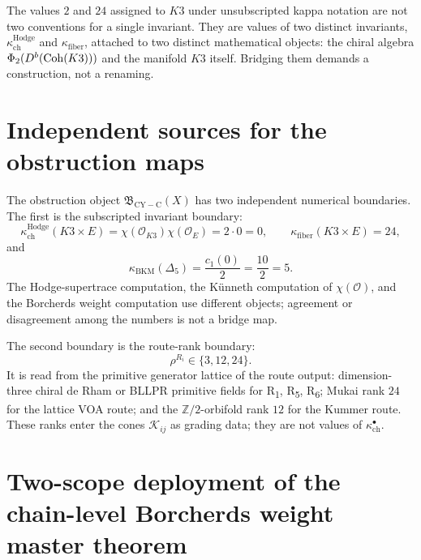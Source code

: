 \begin{remark}[\texorpdfstring{$\kappa_{\mathrm{ch}}^{\mathrm{Hodge}}(K3) = 2$}{kappa-ch(K3) = 2} vs.\ \texorpdfstring{$\kappa_{\mathrm{fiber}}(K3) = 24$}{kappa-fib(K3) = 24}: two invariants, one unsubscripted symbol]
\label{rem:kappa-K3-two-invariants}
The values $2$ and $24$ assigned to $K3$ under unsubscripted kappa
notation are not two conventions for a single invariant. They are values
of two distinct invariants, $\kappa_{\mathrm{ch}}^{\mathrm{Hodge}}$ and
$\kappa_{\mathrm{fiber}}$, attached to two distinct mathematical
objects: the chiral algebra $\Phi_2(D^b(\mathrm{Coh}(K3)))$ and the manifold
$K3$ itself. Bridging them demands a construction, not a renaming.
\end{remark}

\section{Independent sources for the obstruction maps}
\label{sec:cy-c-hziv}

The obstruction object
\(\mathfrak B_{\mathrm{CY-C}}(X)\) has two independent numerical
boundaries. The first is the subscripted invariant boundary:
\[
 \kappa_{\mathrm{ch}}^{\mathrm{Hodge}}(K3\times E)
 =\chi(\mathcal O_{K3})\chi(\mathcal O_E)=2\cdot 0=0,\qquad
 \kappa_{\mathrm{fiber}}(K3\times E)=24,
\]
and
\[
 \kappa_{\mathrm{BKM}}(\Delta_5)=\frac{c_1(0)}{2}=\frac{10}{2}=5.
\]
The Hodge-supertrace computation, the K\"unneth computation of
\(\chi(\mathcal O)\), and the Borcherds weight computation use
different objects; agreement or disagreement among the numbers is not a
bridge map.

The second boundary is the route-rank boundary:
\[
 \rho^{R_i}\in\{3,12,24\}.
\]
It is read from the primitive generator lattice of the route output:
dimension-three chiral de Rham or BLLPR primitive fields for
R\textsubscript{1}, R\textsubscript{5}, R\textsubscript{6}; Mukai
rank \(24\) for the lattice VOA route; and the \(\mathbb Z/2\)-orbifold
rank \(12\) for the Kummer route. These ranks enter the cones
\(\mathcal K_{ij}\) as grading data; they are not values of
\(\kappa_{\mathrm{ch}}^{\bullet}\).

\section{Two-scope deployment of the chain-level Borcherds weight
master theorem}
\label{sec:cy-c-bl-two-scope-deployment}

\providecommand{\PhiFAt}{\Phi^{\mathrm{FA}}_{3}}
\providecommand{\PhiFAdim}[1]{\Phi^{\mathrm{FA}}_{#1}}
\providecommand{\EdHolFA}{E_{3}\text{-}\mathrm{hFA}}
\providecommand{\BEK}[1]{B^{E_{#1}}}
\providecommand{\kBKM}{\kappa_{\mathrm{BKM}}}
\providecommand{\Mbar}{\overline{\mathcal{M}}}
\providecommand{\Irb}{I_{\mathrm{orb}}}
\providecommand{\SpFour}{\mathrm{Sp}_{4}(\mathbb{Z})}

